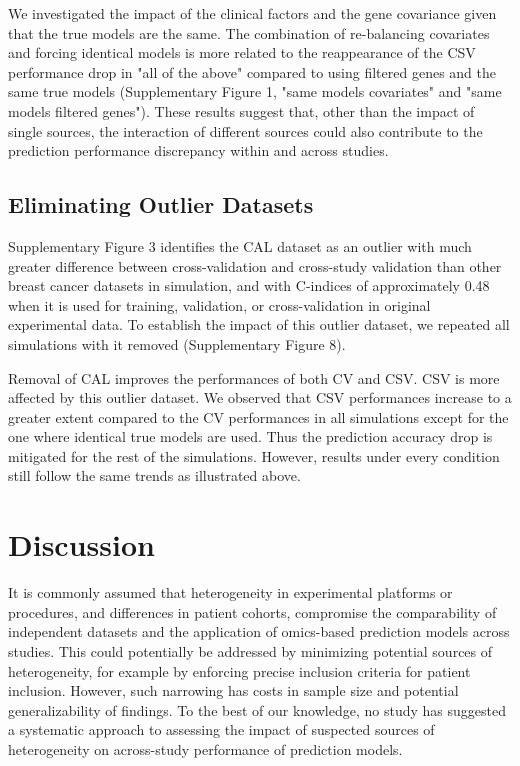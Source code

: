 \documentclass{bioinfo}
\begin{document}
	We investigated the impact of the clinical factors and the gene covariance given that
	the true models are the same. The combination of re-balancing 
	covariates and forcing identical models is more related to the reappearance of 
	the CSV performance drop in "all of the above" compared to using filtered genes 
	and the same true models (Supplementary Figure 1, "same models covariates" 
	and "same models filtered genes"). These results suggest that,
	other than the impact of single sources,
	the interaction of different sources could also contribute to the prediction performance 
	discrepancy within and across studies.
	
	
	

  \subsection{Eliminating Outlier Datasets}
  Supplementary Figure 3 identifies the CAL dataset as an outlier with
  much greater difference between cross-validation and cross-study
  validation than other breast cancer datasets in simulation, and with C-indices of
  approximately 0.48 when it is used for training, validation, or
  cross-validation in original experimental data.  To establish the
  impact of this outlier dataset, we repeated all simulations with it
  removed (Supplementary Figure 8). %

  Removal of CAL improves the performances of both CV and CSV. CSV is more affected by this outlier dataset. We observed that CSV performances increase to a greater extent compared to the CV performances in all simulations except for the one where identical true models are used. Thus the
  prediction accuracy drop is mitigated for the rest of the simulations. However, results under 
  every condition still follow the same trends as illustrated above.
  
\section{Discussion}

It is commonly assumed that heterogeneity in experimental platforms or
procedures, and differences in patient cohorts, compromise the
comparability of independent datasets and the application of
omics-based prediction models across studies.  This could potentially be addressed by
minimizing potential sources of heterogeneity, for example by
enforcing precise inclusion criteria for patient inclusion.
However, such narrowing has costs in sample size and
potential generalizability of findings.  To the best of our knowledge,
no study has suggested a systematic approach to assessing the impact
of suspected sources of heterogeneity on across-study performance of
prediction models.
\end{document}
